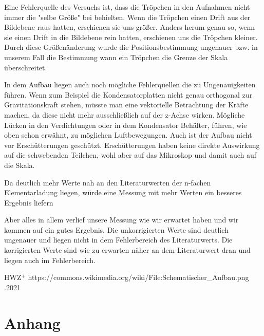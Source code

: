\documentclass{scrartcl}
\begin{document}
                Eine Fehlerquelle des Versuchs ist, dass die Tröpchen in den Aufnahmen nicht immer die "selbe Größe"
                bei behielten. Wenn die Tröpchen einen Drift aus der Bildebene raus hatten, erschienen sie uns größer. 
                Anders herum genau so, wenn sie einen Drift in die Bildebene rein hatten, erschienen uns die Tröpchen kleiner.
                Durch diese Größenänderung wurde die Positionsbestimmung ungenauer bzw. in unserem Fall die Bestimmung
                wann ein Tröpchen die Grenze der Skala überschreitet.
                
                In dem Aufbau liegen auch noch mögliche Fehlerquellen die zu Ungenauigkeiten führen. 
                Wenn zum Beispiel die Kondensatorplatten nicht genau orthogonal zur Gravitationskraft stehen,
                müsste man eine vektorielle Betrachtung der Kräfte machen, da diese nicht mehr ausschließlich
                auf der z-Achse wirken. Mögliche Lücken in den Verdichtungen oder in dem Kondensator Behälter, 
                führen, wie oben schon erwähnt, zu möglichen Luftbewegungen. Auch ist der Aufbau nicht vor Erschütterungen
                geschützt. Erschütterungen haben keine direkte Auswirkung auf die schwebenden Teilchen, wohl aber 
                auf das Mikroskop und damit auch auf die Skala.

                Da deutlich mehr Werte nah an den Literaturwerten der n-fachen Elementarladung liegen, würde eine Messung
                mit mehr Werten ein besseres Ergebnis liefern

                Aber alles in allem verlief unsere Messung wie wir erwartet haben und wir kommen auf ein gutes Ergebnis. Die unkorrigierten Werte sind deutlich ungenauer
                und liegen nicht in dem Fehlerbereich des Literaturwerts. Die korrigierten Werte sind wie zu erwarten 
                näher an dem Literaturwert dran und liegen auch im Fehlerbereich. 
            
                \newcommand{\etalchar}[1]{$^{#1}$}
                \begin{thebibliography}{HWZ{\etalchar{+}}}
                    \newblock https://commons.wikimedia.org/wiki/File:Schematischer\_Aufbau.png
                    .2021
                \end{thebibliography}

                \section{Anhang}
\end{document}
